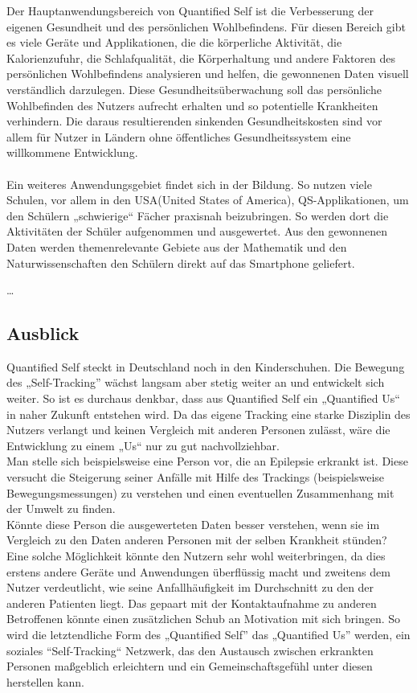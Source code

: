 Der Hauptanwendungsbereich von Quantified Self ist die Verbesserung der eigenen Gesundheit und des persönlichen Wohlbefindens. 
Für diesen Bereich gibt es viele Geräte und Applikationen, die die körperliche Aktivität, die Kalorienzufuhr, die Schlafqualität, die Körperhaltung und andere Faktoren des persönlichen Wohlbefindens analysieren und helfen, die gewonnenen Daten visuell verständlich darzulegen. 
Diese Gesundheitsüberwachung soll das persönliche Wohlbefinden des Nutzers aufrecht erhalten und so potentielle Krankheiten verhindern.
Die daraus resultierenden sinkenden Gesundheitskosten sind vor allem für Nutzer in Ländern ohne öffentliches Gesundheitssystem eine willkommene Entwicklung.
\\
\\
Ein weiteres Anwendungsgebiet findet sich in der Bildung. 
So nutzen viele Schulen, vor allem in den USA(United States of America), QS-Applikationen, um den Schülern „schwierige“ Fächer praxisnah beizubringen. 
So werden dort die Aktivitäten der Schüler aufgenommen und ausgewertet.
Aus den gewonnenen Daten werden themenrelevante Gebiete aus der Mathematik und den Naturwissenschaften den Schülern direkt auf das Smartphone geliefert.\cite{web:QSEducation}

\ldots 


\subsection{Ausblick}
\label{ch:Grundlagen:sec:QuantifiedSelf:subsec:Ausblick}

Quantified Self steckt in Deutschland noch in den Kinderschuhen.
Die Bewegung des „Self-Tracking” wächst langsam aber stetig weiter an und entwickelt sich weiter.
So ist es durchaus denkbar, dass aus Quantified Self ein „Quantified Us“ in naher Zukunft entstehen wird.
Da das eigene Tracking eine starke Disziplin des Nutzers verlangt und keinen Vergleich mit anderen Personen zulässt, wäre die Entwicklung zu einem „Us“ nur zu gut nachvollziehbar.
\\
Man stelle sich beispielsweise eine Person vor, die an Epilepsie erkrankt ist. 
Diese versucht die Steigerung seiner Anfälle mit Hilfe des Trackings (beispielsweise Bewegungsmessungen) zu verstehen und einen eventuellen Zusammenhang mit der Umwelt zu finden. \\	
Könnte diese Person die ausgewerteten Daten besser verstehen, wenn sie im Vergleich zu den Daten anderen Personen mit der selben Krankheit stünden? \\
Eine solche Möglichkeit könnte den Nutzern sehr wohl weiterbringen, da dies erstens andere Geräte und Anwendungen überflüssig macht und zweitens dem Nutzer verdeutlicht, wie seine Anfallhäufigkeit im Durchschnitt zu den der anderen Patienten liegt.
Das gepaart mit der Kontaktaufnahme zu anderen Betroffenen könnte einen zusätzlichen Schub an Motivation mit sich bringen. 
So wird die letztendliche Form des „Quantified Self” das „Quantified Us” werden, ein soziales “Self-Tracking“ Netzwerk, das den Austausch zwischen erkrankten Personen maßgeblich erleichtern und ein Gemeinschaftsgefühl unter diesen herstellen kann.


